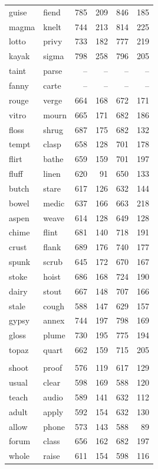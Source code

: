 \documentclass[
]{interact}
\begin{document}
\begin{longtable*}{llrrrr}
guise & fiend & 785 & 209 & 846 & 185 \\ 
magma & knelt & 744 & 213 & 814 & 225 \\ 
lotto & privy & 733 & 182 & 777 & 219 \\ 
kayak & sigma & 798 & 258 & 796 & 205 \\ 
taint & parse & – & – & – & – \\ 
fanny & carte & – & – & – & – \\ 
rouge & verge & 664 & 168 & 672 & 171 \\ 
vitro & mourn & 665 & 171 & 682 & 186 \\ 
floss & shrug & 687 & 175 & 682 & 132 \\ 
tempt & clasp & 658 & 128 & 701 & 178 \\ 
flirt & bathe & 659 & 159 & 701 & 197 \\ 
fluff & linen & 620 & 91 & 650 & 133 \\ 
butch & stare & 617 & 126 & 632 & 144 \\ 
bowel & medic & 637 & 166 & 663 & 218 \\ 
aspen & weave & 614 & 128 & 649 & 128 \\ 
chime & flint & 681 & 140 & 718 & 191 \\ 
crust & flank & 689 & 176 & 740 & 177 \\ 
spunk & scrub & 645 & 172 & 670 & 167 \\ 
stoke & hoist & 686 & 168 & 724 & 190 \\ 
dairy & stout & 667 & 148 & 707 & 166 \\ 
stale & cough & 588 & 147 & 629 & 157 \\ 
gypsy & annex & 744 & 197 & 798 & 169 \\ 
gloss & plume & 730 & 195 & 775 & 194 \\ 
topaz & quart & 662 & 159 & 715 & 205 \\ 
\midrule\addlinespace[2.5pt]
 \\ 
\midrule\addlinespace[2.5pt]
shoot & proof & 576 & 119 & 617 & 129 \\ 
usual & clear & 598 & 169 & 588 & 120 \\ 
teach & audio & 589 & 141 & 632 & 112 \\ 
adult & apply & 592 & 154 & 632 & 130 \\ 
allow & phone & 573 & 143 & 588 & 89 \\ 
forum & class & 656 & 162 & 682 & 197 \\ 
whole & raise & 611 & 154 & 598 & 116 \\ 

\end{longtable*}
\end{document}
